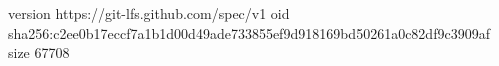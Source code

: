 version https://git-lfs.github.com/spec/v1
oid sha256:c2ee0b17eccf7a1b1d00d49ade733855ef9d918169bd50261a0c82df9c3909af
size 67708
